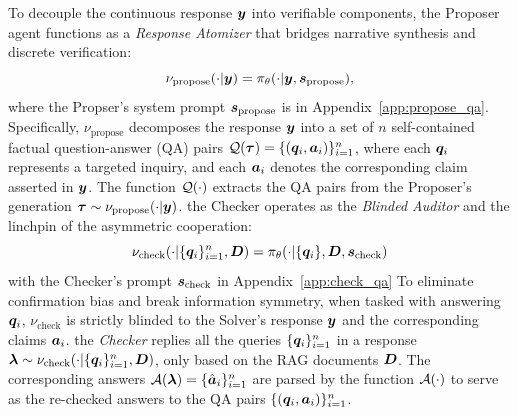 \documentclass[10pt, a4paper, logo]{googledeepmind} %
\begin{document}
To decouple the continuous response ${\bm{y}}$ into verifiable components, the {Proposer} agent functions as a \textit{Response Atomizer} that bridges narrative synthesis and discrete verification:
\begin{equation}
  \nu_{\text{propose}}(\cdot | {\bm{y}}) = \pi_{\theta}(\cdot|  {\bm{y}}, {\bm{s}}_\text{propose}),
\end{equation}
where the Propser's system prompt ${\bm{s}}_\text{propose}$ is in Appendix~\ref{app:propose_qa}.
Specifically,  $\nu_{\text{propose}}$ decomposes the response ${\bm{y}}$ into a set of $n$ self-contained factual question-answer (QA) pairs $\mathcal{Q}({\bm{\tau}}) = \{({\bm{q}}_i, {\bm{a}}_i)\}_{i=1}^n$, where each ${\bm{q}}_i$ represents a targeted inquiry,  and each ${\bm{a}}_i$ denotes the corresponding claim asserted in ${\bm{y}}$. The function ${\mathcal{Q}}(\cdot)$ extracts the QA pairs from the Proposer's generation ${\bm{\tau}} \sim \nu_\text{propose}(\cdot|{\bm{y}})$.  %
the {Checker} operates as the \textit{Blinded Auditor} and the linchpin of the asymmetric cooperation:
\begin{equation}
    \nu_{\text{check}}(\cdot |\{{\bm{q}}_i\}_{i=1}^n, {\bm{D}}) = \pi_{\theta}(\cdot| \{ {\bm{q}}_i\}, {\bm{D}}, {\bm{s}}_\text{check})
\end{equation}
with the Checker's prompt ${\bm{s}}_\text{check}$ in Appendix~\ref{app:check_qa}
To eliminate confirmation bias and break information symmetry, when tasked with answering ${\bm{q}}_i$,  $\nu_{\text{check}}$ is strictly {blinded} to the Solver's response ${\bm{y}}$ and the corresponding claims ${\bm{a}}_i$. %
%
the \textit{Checker} replies all the queries $\{ {\bm{q}}_i\}_{i=1}^n$ in a response $\bm{\lambda}\sim \nu_\text{check}(\cdot|\{{\bm{q}}_i\}_{i=1}^n, {\bm{D}})$, only based on the RAG documents ${\bm{D}}$. The corresponding answers ${\mathcal{A}}(\bm{\lambda}) = \{\hat{{\bm{a}}}_i\}_{i=1}^n$ are parsed by the function ${\mathcal{A}}(\cdot)$ to serve as the re-checked answers to the QA pairs $\{({\bm{q}}_i, {\bm{a}}_i)\}_{i=1}^n$.
\end{document}
